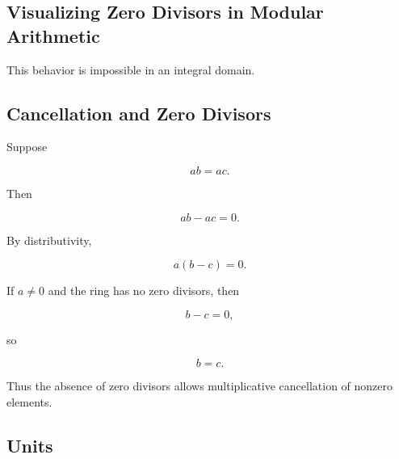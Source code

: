 \subsection{Visualizing Zero Divisors in Modular Arithmetic}
\label{subsec:visual-zero-divisors}

\begin{center}
\end{center}

This behavior is impossible in an integral domain.

\subsection{Cancellation and Zero Divisors}
\label{subsec:ring-cancellation-zero-divisors}

Suppose

\[ ab=ac. \]

Then

\[ ab-ac=0. \]

By distributivity,

\[ a(b-c)=0. \]

If \(a\neq0\) and the ring has no zero divisors, then

\[ b-c=0, \]

so

\[ b=c. \]

Thus the absence of zero divisors allows multiplicative cancellation of
nonzero elements.

\subsection{Units}
\label{subsec:ring-units}

